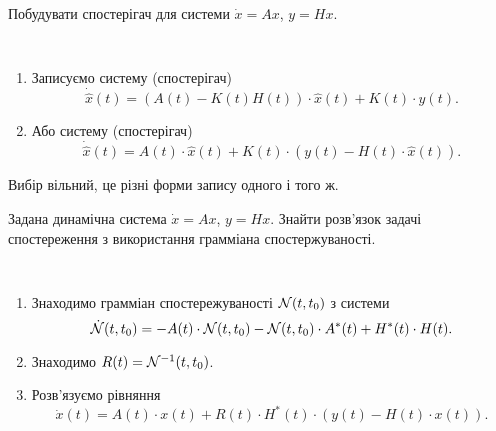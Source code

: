\begin{problem*}
    Побудувати спостерігач для системи $\dot x = A x$, $y = H x$.
\end{problem*}

\begin{algorithm} \tt
    \begin{enumerate}
        \item Записуємо систему (спостерігач) \[ \dot{\hat{x}} (t) = (A (t) - K (t) H (t)) \cdot \hat x (t) + K(t) \cdot y(t).\]
        \item Або систему (спостерігач) \[ \dot{\hat{x}} (t) = A (t) \cdot \hat x (t) + K(t) \cdot (y(t) - H(t) \cdot \hat x(t)).\]
    \end{enumerate}
    Вибір вільний, це різні форми запису одного і того ж.
\end{algorithm}

\begin{problem*}
    Задана динамічна система $\dot x = A x$, $y = H x$. Знайти розв'язок задачі спостереження з використання грамміана спостержуваності.
\end{problem*}

\begin{algorithm} \tt
    \begin{enumerate}
        \item Знаходимо грамміан спостережуваності $\mathcal{N}(t,t_0)$ з сис\-те\-ми \[ \dot {\mathcal{N}}(t, t_0) = -A(t) \cdot \mathcal{N}(t, t_0) - \mathcal{N}(t, t_0) \cdot A^*(t) + H^*(t) \cdot H(t). \]

        \item Знаходимо $R(t) = \mathcal{N}^{-1}(t, t_0)$.

        \item Розв'язуємо рівняння \[ \dot x(t) = A(t) \cdot x(t) + R(t) \cdot H^*(t) \cdot (y(t) - H(t) \cdot x(t)). \]
    \end{enumerate}
\end{algorithm}

